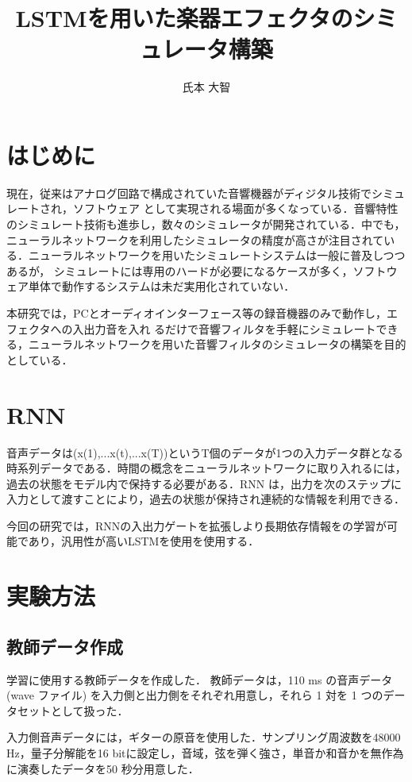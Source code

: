 \documentclass{jarticle}
\title{LSTMを用いた楽器エフェクタのシミュレータ構築} %
\author{氏本 大智}%
\begin{document}
%
\maketitle %

\section{はじめに}%
現在，従来はアナログ回路で構成されていた音響機器がディジタル技術でシミュレートされ，ソフトウェア として実現される場面が多くなっている．音響特性のシミュレート技術も進歩し，数々のシミュレータが開発されている．中でも，ニューラルネットワークを利用したシミュレータの精度が高さが注目されている．ニューラルネットワークを用いたシミュレートシステムは一般に普及しつつあるが， シミュレートには専用のハードが必要になるケースが多く，ソフトウェア単体で動作するシステムは未だ実用化されていない．

本研究では，PCとオーディオインターフェース等の録音機器のみで動作し，エフェクタへの入出力音を入れ るだけで音響フィルタを手軽にシミュレートできる，ニューラルネットワークを用いた音響フィルタのシミュレータの構築を目的としている．

\section{RNN}
音声データは(x(1),...x(t),...x(T))というT個のデータが1つの入力データ群となる時系列データである．時間の概念をニューラルネットワークに取り入れるには，過去の状態をモデル内で保持する必要がある．RNN は，出力を次のステップに入力として渡すことにより，過去の状態が保持され連続的な情報を利用できる．

今回の研究では，RNNの入出力ゲートを拡張しより長期依存情報をの学習が可能であり，汎用性が高いLSTMを使用を使用する．

\section{実験方法}
\subsection{教師データ作成}
学習に使用する教師データを作成した．
教師データは，110 ms の音声データ (wave ファイル) を入力側と出力側をそれぞれ用意し，それら 1 対を 1 つのデータセットとして扱った．

入力側音声データには，ギターの原音を使用した．サンプリング周波数を48000 Hz，量子分解能を16 bitに設定し，音域，弦を弾く強さ，単音か和音かを無作為に演奏したデータを50 秒分用意した．
\end{document}
